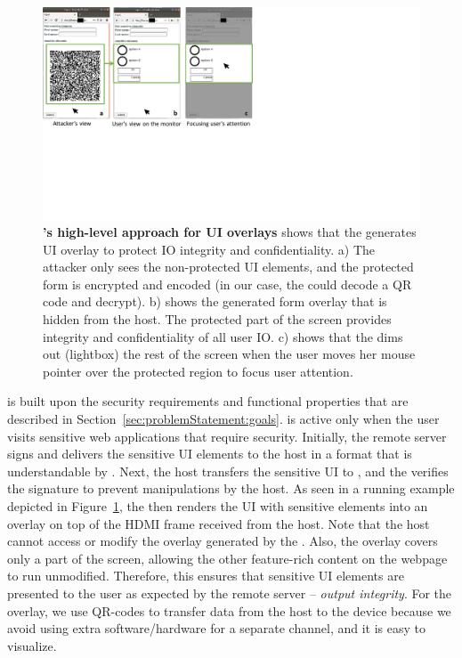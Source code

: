 \begin{figure}[t]
\centering
\includegraphics[trim={0 8cm 15cm 0}, clip, width=\linewidth]{chapters/ProtectIOn/images/overlayScreenShot_new.pdf}
\caption[\name's high-level approach for UI overlays]{\textbf{\name's high-level approach for UI overlays} shows that the \device generates UI overlay to protect IO integrity and confidentiality. a) The attacker only sees the non-protected UI elements, and the protected form is encrypted and encoded (in our case, the \device could decode a QR code and decrypt). b) shows the \device generated form overlay that is hidden from the host. The protected part of the screen provides integrity and confidentiality of all user IO. c) shows that the \device dims out (lightbox) the rest of the screen when the user moves her mouse pointer over the protected region to focus user attention.}

\label{fig:screenshot_1}
\end{figure}

\name is built upon the security requirements and functional properties that are described in Section~\ref{sec:problemStatement:goals}.
\device is active only when the user visits sensitive web applications that require \name security.
Initially, the remote server signs and delivers the sensitive UI elements to the host in a format that is understandable by \device. Next, the host transfers the sensitive UI to \device, and the \device verifies the signature to prevent manipulations by the host. As seen in a running example depicted in Figure~\ref{fig:screenshot_1}, the \device then renders the UI with sensitive elements into an overlay on top of the HDMI frame received from the host. Note that the host cannot access or modify the overlay generated by the \device. Also, the overlay covers only a part of the screen, allowing the other feature-rich content on the webpage to run unmodified. Therefore, this ensures that sensitive UI elements are presented to the user as expected by the remote server -- \emph{output integrity}. For the overlay, we use QR-codes to transfer data from the host to the device because we avoid using extra software/hardware for a separate channel, and it is easy to visualize.

